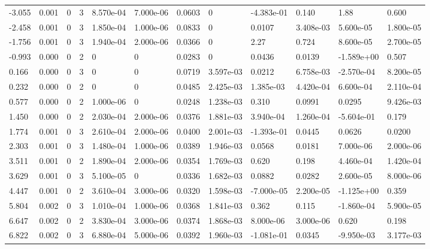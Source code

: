 \documentclass[preview]{standalone}
\begin{document}
{{\begin{tabular}{L{1.2cm}C{1.2cm} C{0.3cm}C{0.5cm} C{1.4cm}C{1.4cm} C{1.4cm}C{1.4cm} C{1.6cm}C{1.6cm} C{1.6cm}C{1.6cm}}
  -3.055  &  0.001  & 0     &  3 &  8.570e-04  & 7.000e-06  &  0.0603&   0& -4.383e-01 & 0.140   &  1.88 & 0.600  \\ 
  -2.458  &  0.001  & 0     &  3 &  1.850e-04  & 1.000e-06  &  0.0833&   0& 0.0107 & 3.408e-03   &  5.600e-05 & 1.800e-05  \\ 
  -1.756  &  0.001  & 0     &  3 &  1.940e-04  & 2.000e-06  &  0.0366&   0& 2.27 & 0.724   &  8.600e-05 & 2.700e-05  \\ 
  -0.993  &  0.000  & 0     &  2 &  0  & 0  &  0.0283&   0& 0.0436 & 0.0139   &  -1.589e+00 & 0.507  \\ 
  0.166  &  0.000  & 0     &  3 &  0  & 0  &  0.0719&   3.597e-03& 0.0212 & 6.758e-03   &  -2.570e-04 & 8.200e-05  \\ 
  0.232  &  0.000  & 0     &  2 &  0  & 0  &  0.0485&   2.425e-03& 1.385e-03 & 4.420e-04   &  6.600e-04 & 2.110e-04  \\ 
  0.577  &  0.000  & 0     &  2 &  1.000e-06  & 0  &  0.0248&   1.238e-03& 0.310 & 0.0991   &  0.0295 & 9.426e-03  \\ 
  1.450  &  0.000  & 0     &  2 &  2.030e-04  & 2.000e-06  &  0.0376&   1.881e-03& 3.940e-04 & 1.260e-04   &  -5.604e-01 & 0.179  \\ 
  1.774  &  0.001  & 0     &  3 &  2.610e-04  & 2.000e-06  &  0.0400&   2.001e-03& -1.393e-01 & 0.0445   &  0.0626 & 0.0200  \\ 
  2.303  &  0.001  & 0     &  3 &  1.480e-04  & 1.000e-06  &  0.0389&   1.946e-03& 0.0568 & 0.0181   &  7.000e-06 & 2.000e-06  \\ 
  3.511  &  0.001  & 0     &  2 &  1.890e-04  & 2.000e-06  &  0.0354&   1.769e-03& 0.620 & 0.198   &  4.460e-04 & 1.420e-04  \\ 
  3.629  &  0.001  & 0     &  3 &  5.100e-05  & 0  &  0.0336&   1.682e-03& 0.0882 & 0.0282   &  2.600e-05 & 8.000e-06  \\ 
  4.447  &  0.001  & 0     &  2 &  3.610e-04  & 3.000e-06  &  0.0320&   1.598e-03& -7.000e-05 & 2.200e-05   &  -1.125e+00 & 0.359  \\ 
  5.804  &  0.002  & 0     &  3 &  1.010e-04  & 1.000e-06  &  0.0368&   1.841e-03& 0.362 & 0.115   &  -1.860e-04 & 5.900e-05  \\ 
  6.647  &  0.002  & 0     &  2 &  3.830e-04  & 3.000e-06  &  0.0374&   1.868e-03& 8.000e-06 & 3.000e-06   &  0.620 & 0.198  \\ 
  6.822  &  0.002  & 0     &  3 &  6.880e-04  & 5.000e-06  &  0.0392&   1.960e-03& -1.081e-01 & 0.0345   &  -9.950e-03 & 3.177e-03  \\ 

\end{tabular}}}
\end{document}

